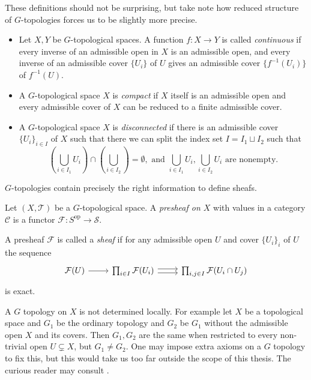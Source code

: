 \begin{definition}
	These definitions should not be surprising, but take note how reduced structure of $G$-topologies forces us to be slightly more precise.  
	\begin{itemize}
		\item  Let $X, Y$ be $G$-topological spaces. 
			A function $f: X \to Y$ is called \emph{continuous} if every inverse of an admissible open in $X$ is an admissible open, and every inverse of an admissible cover $\{U_i\} $ of $U$ gives an admissible cover $\{f^{-1}(U_i)\} $ of $f^{-1}(U)$. 
		\item A $G$-topological space $X$ is \emph{compact} if $X$ itself is an admissible open and every admissible cover of $X$ can be reduced to a finite admissible cover. 
		\item A $G$-topological space $X$ is \emph{disconnected} if there is an admissible cover $\{U_i\} _{i \in I}$ of $X$ such that there we can split the index set $I = I_1 \sqcup I_2$  such that \[
				\left(\bigcup_{i \in  I_1} U_i\right)\cap \left( \bigcup_{i \in I_2}  \right)  = \emptyset, \text{ and } \bigcup_{i \in I_1} U_i, \bigcup_{i \in I_2} U_i \text{ are nonempty}
		.\] 
	\end{itemize}
\end{definition}

$G$-topologies contain precisely the right information to define sheafs. 
\begin{definition}
	Let $(X, \mathcal{T} )$ be a $G$-topological space.
	A \emph{presheaf on $X$} with values in a category $\mathcal{C} $ is a functor $\mathcal{F} :S^{\text{op}} \to \mathcal{S} $. 

	A presheaf $\mathcal{F} $ is called a \emph{sheaf} if for any admissible open  $U$ and cover $\{U_i\}_i $ of $U$ the sequence \[
	\begin{tikzcd}
		\mathcal{F} (U) \rar & \prod_{i \in I} \mathcal{F} (U_i) \rar[shift left]\rar[shift right] & \prod_{i, j \in I} \mathcal{F} (U_{i} \cap U_j)
	\end{tikzcd}
	\] 
	is exact. 
\end{definition}
\begin{remark}\label{rem:g_topology_local}
	A $G$ topology on $X$ is not determined locally. 
	For example let $X$ be a topological space and $G_1$ be the ordinary topology and $G_2$ be $G_1$ without the admissible open $X$ and its covers.  
	Then $G_1, G_2$ are the same when restricted to every non-trivial open  $U \subsetneq X$, but $G_1 \ne G_2$. 
	One may impose extra axioms on a $G$ topology to fix this, but this would take us too far outside the scope of this thesis. 
	The curious reader may consult \cite[sec.\ 9.1.2]{siegfriedboschNonArchimedeanAnalysisSystematic1984}.
\end{remark}



